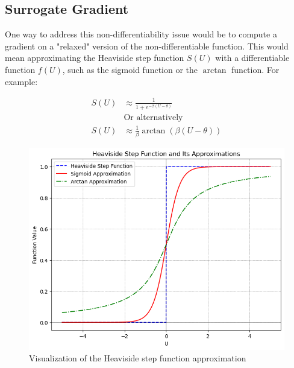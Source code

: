 \documentclass[11pt]{article}
\begin{document}
\subsection{Surrogate Gradient}

One way to address this non-differentiability issue would be to compute a gradient on a "relaxed" version of the non-differentiable function. This would mean approximating the Heaviside step function $S(U)$ with a differentiable function $f(U)$, such as the sigmoid function or the $\arctan$ function. For example:

\begin{figure}[ht]
  \begin{minipage}[t]{0.5\textwidth}
    \vspace{40pt} %
    $$\begin{aligned}
        S(U) & \approx \frac{1}{1 + e^{-\beta(U - \theta)}}       \\
             & \text{Or alternatively}                            \\
        S(U) & \approx \frac{1}{\beta} \arctan(\beta(U - \theta))
      \end{aligned}$$
  \end{minipage}
  \hfill
  \begin{minipage}[t]{0.45\textwidth}
    \vspace{0pt} %
    \centering
    \includegraphics[width=\textwidth]{./image/approx_surrogate.png}
    \caption{Visualization of the Heaviside step function approximation\cite{LIAO2023126470}}
    \label{fig:approx_surrogate}
  \end{minipage}
\end{figure}
\end{document}
